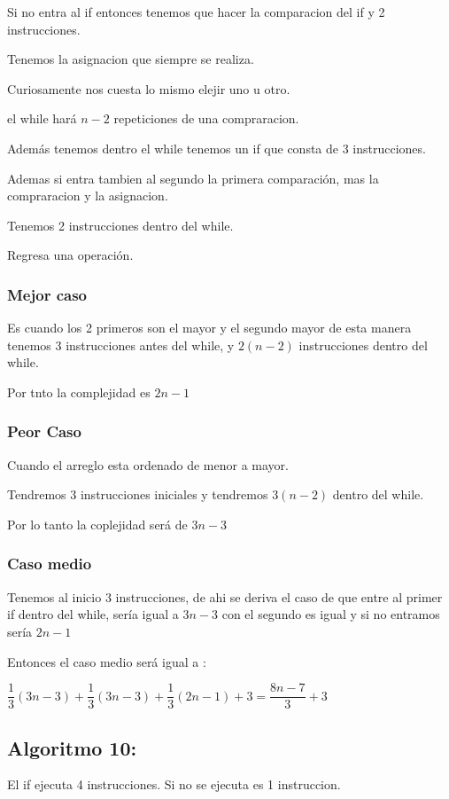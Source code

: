 \documentclass[12pt, fleqn]{article}                             %
\theoremstyle{break}                                            %
\begin{document}
    Si no entra al if entonces tenemos que hacer la comparacion del if  y 2 instrucciones.

    Tenemos la asignacion que siempre se realiza.

    Curiosamente nos cuesta lo mismo elejir uno u otro.

    el while hará $n-2$ repeticiones de una compraracion.


    Además tenemos dentro el while tenemos un if que consta de 3 instrucciones.


    Ademas si entra tambien al segundo  la primera comparación, mas la compraracion y la asignacion.

    Tenemos 2 instrucciones dentro del while.

    Regresa una operación.

    \subsubsection{Mejor caso}
    Es cuando los 2 primeros son el mayor y el segundo mayor de esta manera tenemos 3 instrucciones antes del while, y $2(n-2)$  instrucciones dentro del while. 

    Por tnto la complejidad es $2n-1$

    \subsubsection{Peor Caso}
    Cuando el arreglo esta ordenado de menor a mayor.

    Tendremos 3 instrucciones iniciales y tendremos $3(n-2)$ dentro del while.

    Por lo tanto la coplejidad será de $3n-3$

    \subsubsection{Caso medio}
    Tenemos al inicio 3 instrucciones, de ahi se deriva el caso de que entre al primer if dentro del while, sería igual a $3n-3$ con el segundo es igual y si no entramos sería $2n-1$

    Entonces el caso medio será igual a :

    $\dfrac{1}{3}(3n-3)+\dfrac{1}{3}(3n-3)+\dfrac{1}{3}(2n-1)+3 = \dfrac{8n-7}{3}+3$

    \subsection{Algoritmo 10:}
    
    El if ejecuta 4 instrucciones. Si no se ejecuta es 1 instruccion.
\end{document}
